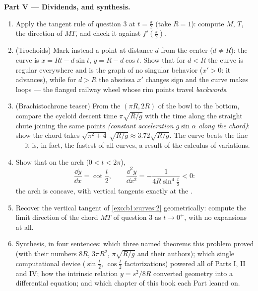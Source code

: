 \begin{problem}
\medskip
\noindent\textbf{Part V --- Dividends, and synthesis.}
\begin{enumerate}[resume]
  \item Apply the tangent rule of question 3 at $t =
        \frac\pi2$ (take $R = 1$): compute $M$, $T$, the
        direction of $MT$, and check it against
        $f'(\frac\pi2)$.
  \item (Trochoids) Mark instead a point at distance $d$ from
        the center ($d \neq R$): the curve is $x = Rt -
        d\sin t$, $y = R - d\cos t$. Show that for $d < R$ the
        curve is regular everywhere and is the graph of no
        singular behavior ($x' > 0$: it advances), while for $d
        > R$ the abscissa $x'$ changes sign and the curve makes
        loops --- the flanged railway wheel whose rim points
        travel \emph{backwards}.
  \item (Brachistochrone teaser) From the  $(\pi R, 2R)$ of
        the bowl to the bottom, compare the cycloid descent time
        $\pi\sqrt{R/g}$ with the time along the straight chute
        joining the same points \emph{(constant acceleration
        $g\sin\alpha$ along the chord)}: show the chord takes
        $\sqrt{\pi^2 + 4}\,\sqrt{R/g} \approx 3.72\sqrt{R/g}$.
        The curve beats the line --- it is, in fact, the fastest
        of all curves, a result of the calculus of variations.
  \item Show that on the arch ($0 < t < 2\pi$),
        \[
        \frac{\dd y}{\dd x} = \cot\frac t2,
        \qquad
        \frac{\dd^2 y}{\dd x^2} =
        -\frac{1}{4R\sin^4\frac t2} < 0 :
        \]
        the arch is concave, with vertical tangents exactly at
        the .
  \item Recover the vertical  tangent of
        \cref{exo:b1:curves:2} geometrically: compute the limit
        direction of the chord $MT$ of question 3 as $t \to
        0^{+}$, with no expansions at all.
  \item Synthesis, in four sentences: which three named theorems
        this problem proved (with their numbers $8R$, $3\pi
        R^2$, $\pi\sqrt{R/g}$ and their authors); which single
        computational device ($\sin\frac t2$, $\cos\frac t2$
        factorizations) powered all of Parts I, II and IV; how
        the intrinsic relation $y = s^2/8R$ converted geometry
        into a  differential equation; and which chapter
        of this book each Part leaned on.
\end{enumerate}
\end{problem}
